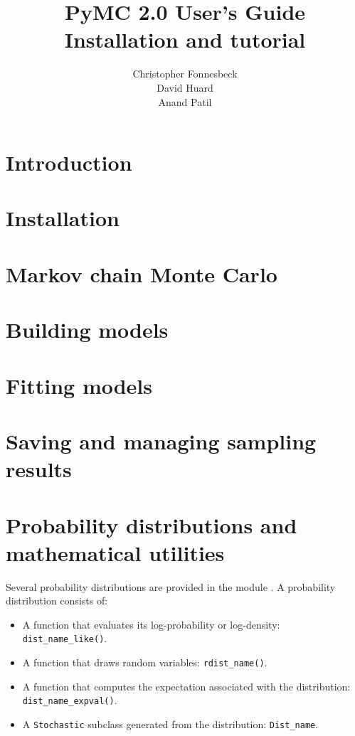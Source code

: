 \documentclass[]{manual}
\title{PyMC 2.0 User's Guide \\
Installation and tutorial}
\author{ Christopher Fonnesbeck\\ David Huard \\ Anand Patil }
\begin{document}
\maketitle

\tableofcontents

\chapter{Introduction} 
\label{chap:intro} 


\chapter{Installation} 
\label{chap:install} 


\chapter{Markov chain Monte Carlo} 
\label{chap:MCMC} 


\chapter{Building models}
\label{chap:modelbuilding} 


\chapter{Fitting models}
\label{chap:modelfitting}


\chapter{Saving and managing sampling results}
\label{chap:database} 


\chapter{Probability distributions and mathematical utilities} 
\label{chap:distributions}
Several probability distributions are provided in the module . A probability distribution consists of:
\begin{itemize}
    \item A function that evaluates its log-probability or log-density: \texttt{dist_name_like()}.
    \item A function that draws random variables: \texttt{rdist_name()}.
    \item A function that computes the expectation associated with the distribution: \texttt{dist_name_expval()}.
    \item A \texttt{Stochastic} subclass generated from the distribution: \texttt{Dist_name}.
\end{itemize} 





\end{document}
